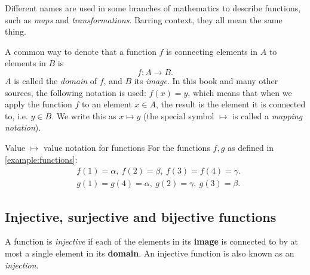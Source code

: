 Different names are used in some branches of mathematics to describe functions, such as \emph{maps} and \emph{transformations}. Barring context, they all mean the same thing.

A common way to denote that a function $f$ is connecting elements in $A$ to elements in $B$ is
\begin{equation}
	f: A\to B.
	\label{eq:function_basics}
\end{equation}
$A$ is called the \emph{domain} of $f$, and $B$ its \emph{image}. In this book and many other sources, the following notation is used: $f(x)=y$, which means that when we apply the function $f$ to an element $x\in A$, the result is the element it is connected to, i.e. $y\in B$. We write this as $x\mapsto y$ (the special symbol $\mapsto$ is called a \emph{mapping notation}).

\begin{example}{Value $\mapsto$ value notation for functions}{}
	For the functions $f,g$ as defined in \autoref{example:functions}:
	\begin{align*}
		&f(1)=\alpha,\ f(2)=\beta,\ f(3)=f(4)=\gamma.\\
		&g(1)=g(4)=\alpha,\ g(2)=\gamma,\ g(3)=\beta.
	\end{align*}
\end{example}

\subsection{Injective, surjective and bijective functions}
A function is \emph{injective} if each of the elements in its \textbf{image} is connected to by at most a single element in its \textbf{domain}. An injective function is also known as an \emph{injection}.

